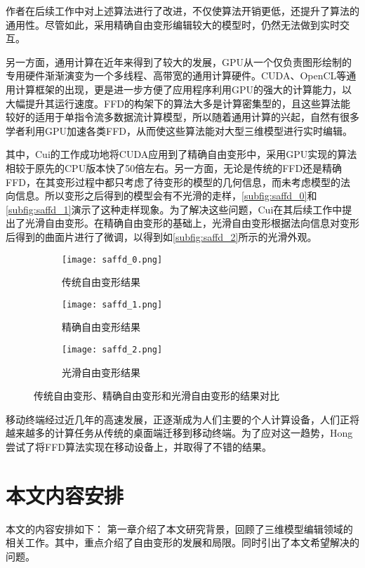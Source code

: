 作者在后续工作\cite{Feng00, Feng02}中对上述算法进行了改进，不仅使算法开销更低，还提升了算法的通用性。尽管如此，采用精确自由变形编辑较大的模型时，仍然无法做到实时交互。

另一方面，通用计算在近年来得到了较大的发展，GPU从一个仅负责图形绘制的专用硬件渐渐演变为一个多线程、高带宽的通用计算硬件。CUDA、OpenCL等通用计算框架的出现，更是进一步方便了应用程序利用GPU的强大的计算能力，以大幅提升其运行速度。FFD的构架下的算法大多是计算密集型的，且这些算法能较好的适用于单指令流多数据流计算模型，所以随着通用计算的兴起，自然有很多学者利用GPU加速各类FFD，从而使这些算法能对大型三维模型进行实时编辑。

其中，Cui\cite{Cui13}的工作成功地将CUDA应用到了精确自由变形中，采用GPU实现的算法相较于原先的CPU版本快了50倍左右。另一方面，无论是传统的FFD还是精确FFD，在其变形过程中都只考虑了待变形的模型的几何信息，而未考虑模型的法向信息。所以变形之后得到的模型会有不光滑的走样，\autoref{subfig:saffd_0}和\autoref{subfig:saffd_1}演示了这种走样现象。为了解决这些问题，Cui在其后续工作\cite{Cui15}中提出了光滑自由变形。在精确自由变形的基础上，光滑自由变形根据法向信息对变形后得到的曲面片进行了微调，以得到如\autoref{subfig:saffd_2}所示的光滑外观。

\begin{figure}[htbp]
	\centering
	\begin{subfigure}[b]{.3\textwidth}
		\centering
		\texttt{[image: saffd\_0.png]}
		\caption{传统自由变形结果}\label{subfig:saffd_0}
	\end{subfigure}
	\quad
	\begin{subfigure}[b]{.3\textwidth}
		\centering
		\texttt{[image: saffd\_1.png]}
		\caption{精确自由变形结果}\label{subfig:saffd_1}
	\end{subfigure}
	\quad
	\begin{subfigure}[b]{.3\textwidth}
		\centering
		\texttt{[image: saffd\_2.png]}
		\caption{光滑自由变形结果}\label{subfig:saffd_2}
	\end{subfigure}
    \caption{传统自由变形、精确自由变形和光滑自由变形的结果对比}\label{fig:sample_problem_saffd}
\end{figure}

移动终端经过近几年的高速发展，正逐渐成为人们主要的个人计算设备，人们正将越来越多的计算任务从传统的桌面端迁移到移动终端。为了应对这一趋势，Hong\cite{hong2013}尝试了将FFD算法实现在移动设备上，并取得了不错的结果。


\section{本文内容安排}
本文的内容安排如下：
第一章介绍了本文研究背景，回顾了三维模型编辑领域的相关工作。其中，重点介绍了自由变形的发展和局限。同时引出了本文希望解决的问题。

